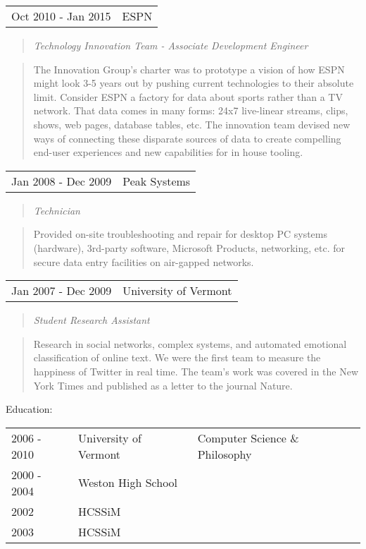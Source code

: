 \documentclass[11pt]{article}
\newcommand{\job}[5]{
  \begin{tabular}{l|l}
    #1 - #2 & #3 \\
  \end{tabular}
  \begin{quotation}
    \noindent\textit{#4}
  \end{quotation}
  \begin{quotation}
    \noindent#5
  \end{quotation} 
}
\newcommand{\project}[2]{
  \begin{quotation}
    {\small\noindent\textit{#1}}
    \begin{quotation}
      {\small\noindent#2}
    \end{quotation}
  \end{quotation}
}
\begin{document}
\job{Oct 2010}{Jan 2015}{ESPN}{Technology Innovation Team - Associate
  Development Engineer}{The Innovation Group's charter was to prototype a vision
  of how ESPN might look 3-5 years out by pushing current technologies to their
  absolute limit. Consider ESPN a factory for data about sports rather than a TV
  network. That data comes in many forms: 24x7 live-linear streams, clips,
  shows, web pages, database tables, etc. The innovation team devised new ways
  of connecting these disparate sources of data to create compelling end-user
  experiences and new capabilities for in house tooling.}

\job{Jan 2008}{Dec 2009}{Peak Systems}{Technician}{Provided on-site
  troubleshooting and repair for desktop PC systems (hardware), 3rd-party
  software, Microsoft Products, networking, etc. for secure data entry
  facilities on air-gapped networks.}

\job{Jan 2007}{Dec 2009}{University of Vermont}{Student Research
  Assistant}{Research in social networks, complex systems, and automated
  emotional classification of online text. We were the first team to measure the
  happiness of Twitter in real time. The team's work was covered in the New York
  Times and published as a letter to the journal Nature.}

\noindent Education:
\vspace{.1in}

\begin{tabular}{lll}
  2006 - 2010 & University of Vermont & Computer Science \& Philosophy\\
  2000 - 2004 & Weston High School &  \\
  2002 &  HCSSiM & \\
  2003 &  HCSSiM & \\ 
\end{tabular}


\end{document}
